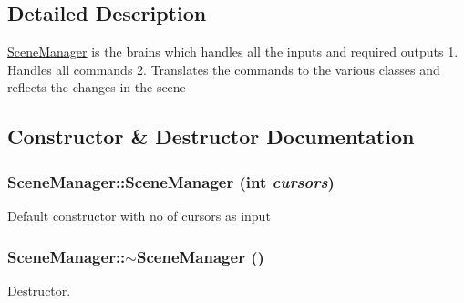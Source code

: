\subsection{Detailed Description}
\hyperlink{class_scene_manager}{SceneManager} is the brains which handles all the inputs and required outputs 1. Handles all commands 2. Translates the commands to the various classes and reflects the changes in the scene 

\subsection{Constructor \& Destructor Documentation}
\hypertarget{class_scene_manager_ad12a7ec5b2fa034bc4462e27d86439c0}{
\subsubsection[{SceneManager}]{\setlength{\rightskip}{0pt plus 5cm}SceneManager::SceneManager (int {\em cursors})}}
\label{class_scene_manager_ad12a7ec5b2fa034bc4462e27d86439c0}
Default constructor with no of cursors as input \hypertarget{class_scene_manager_a2bb376a85d29e85f47753e26c7539229}{
\subsubsection[{$\sim$SceneManager}]{\setlength{\rightskip}{0pt plus 5cm}SceneManager::$\sim$SceneManager ()}}
\label{class_scene_manager_a2bb376a85d29e85f47753e26c7539229}
Destructor. 

